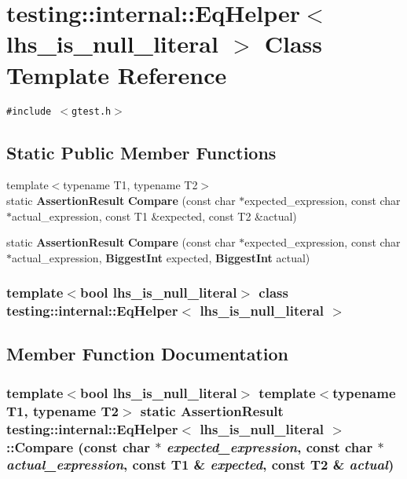 \section{testing::internal::EqHelper$<$ lhs\_\-is\_\-null\_\-literal $>$ Class Template Reference}
\label{classtesting_1_1internal_1_1EqHelper}
{\tt \#include $<$gtest.h$>$}

\subsection*{Static Public Member Functions}
\begin{CompactItemize}
\item 
{\footnotesize template$<$typename T1, typename T2$>$ }\\static {\bf AssertionResult} {\bf Compare} (const char $\ast$expected\_\-expression, const char $\ast$actual\_\-expression, const T1 \&expected, const T2 \&actual)
\item 
static {\bf AssertionResult} {\bf Compare} (const char $\ast$expected\_\-expression, const char $\ast$actual\_\-expression, {\bf BiggestInt} expected, {\bf BiggestInt} actual)
\end{CompactItemize}
\subsubsection*{template$<$bool lhs\_\-is\_\-null\_\-literal$>$ class testing::internal::EqHelper$<$ lhs\_\-is\_\-null\_\-literal $>$}



\subsection{Member Function Documentation}
\subsubsection{\setlength{\rightskip}{0pt plus 5cm}template$<$bool lhs\_\-is\_\-null\_\-literal$>$ template$<$typename T1, typename T2$>$ static {\bf AssertionResult} {\bf testing::internal::EqHelper}$<$ lhs\_\-is\_\-null\_\-literal $>$::Compare (const char $\ast$ {\em expected\_\-expression}, const char $\ast$ {\em actual\_\-expression}, const T1 \& {\em expected}, const T2 \& {\em actual})\hspace{0.3cm}{\tt  [inline, static]}}\label{classtesting_1_1internal_1_1EqHelper_b60379c1c1456b9901ac99b9a9a3b0bf}


